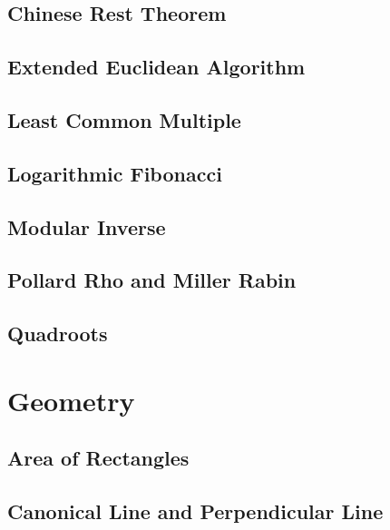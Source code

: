 \documentclass[10pt]{article}
\begin{document}
\subsection{\texorpdfstring{{Chinese Rest Theorem}}{{Chinese Rest Theorem}}}

\subsection{\texorpdfstring{{Extended Euclidean Algorithm}}{{Extended Euclidean Algorithm}}}

\subsection{\texorpdfstring{{Least Common Multiple}}{{Least Common Multiple}}}

\subsection{\texorpdfstring{{Logarithmic Fibonacci}}{{Logarithmic Fibonacci}}}

\subsection{\texorpdfstring{{Modular Inverse}}{{Modular Inverse}}}

\subsection{\texorpdfstring{{Pollard Rho and Miller Rabin}}{{Pollard Rho and Miller Rabin}}}

\subsection{\texorpdfstring{{Quadroots}}{{Quadroots}}}


\section{Geometry}
\subsection{\texorpdfstring{{Area of Rectangles}}{{Area of Rectangles}}}

\subsection{\texorpdfstring{{Canonical Line and Perpendicular Line}}{{Canonical Line and Perpendicular Line}}}

\end{document}
